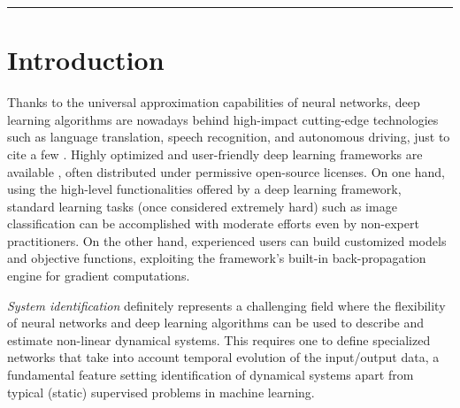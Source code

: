 \documentclass{article}
\begin{document}
\noindent\rule{\textwidth}{1pt}




\section{Introduction}


Thanks to  the universal approximation capabilities of neural networks, deep learning algorithms are nowadays behind high-impact cutting-edge technologies such as language translation, speech recognition, and autonomous driving, just to cite a few \cite{schmidhuber2015deep}. Highly optimized and user-friendly deep learning frameworks are available \cite{paszke:2017automatic}, often distributed under permissive open-source licenses.
On one hand, using the high-level functionalities offered by a deep learning framework, standard learning tasks (once considered extremely hard) such as image classification can be accomplished with moderate efforts even by non-expert practitioners. On the other hand, experienced users can build customized models and objective functions,
exploiting the framework's built-in back-propagation engine \cite{rumelhart1988learning} for gradient computations. 

\emph{System identification} definitely represents a challenging field where the flexibility of neural networks and  deep learning algorithms can be used to describe and estimate non-linear dynamical systems. This requires {one} to define specialized networks that take into account  temporal evolution of the input/output data, a fundamental feature setting identification of dynamical systems apart from typical (static) supervised problems in machine learning.   
\end{document}
